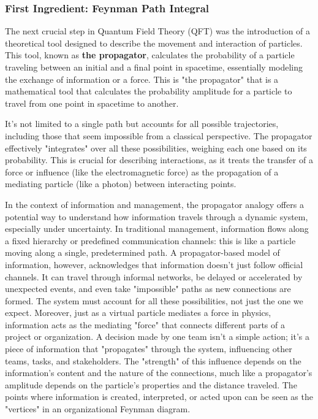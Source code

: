 \documentclass{article}
\begin{document}
\subsubsection*{First Ingredient: Feynman Path Integral}
The next crucial step in Quantum Field Theory (QFT) was the introduction of a theoretical tool designed to describe the movement and interaction of particles. This tool, known as \textbf{the propagator}, calculates the probability of a particle traveling between an initial and a final point in spacetime, essentially modeling the exchange of information or a force. This is "the propagator" that is a mathematical tool that calculates the probability amplitude for a particle to travel from one point in spacetime to another. 

It's not limited to a single path but accounts for all possible trajectories, including those that seem impossible from a classical perspective. The propagator effectively "integrates" over all these possibilities, weighing each one based on its probability. This is crucial for describing interactions, as it treats the transfer of a force or influence (like the electromagnetic force) as the propagation of a mediating particle (like a photon) between interacting points.

In the context of information and management, the propagator analogy offers a potential way to understand how information travels through a dynamic system, especially under uncertainty. In traditional management, information flows along a fixed hierarchy or predefined communication channels: this is like a particle moving along a single, predetermined path. A propagator-based model of information, however, acknowledges that information doesn't just follow official channels. It can travel through informal networks, be delayed or accelerated by unexpected events, and even take "impossible" paths as new connections are formed. The system must account for all these possibilities, not just the one we expect. Moreover, just as a virtual particle mediates a force in physics, information acts as the mediating "force" that connects different parts of a project or organization. A decision made by one team isn't a simple action; it's a piece of information that "propagates" through the system, influencing other teams, tasks, and stakeholders. The "strength" of this influence depends on the information's content and the nature of the connections, much like a propagator's amplitude depends on the particle's properties and the distance traveled. The points where information is created, interpreted, or acted upon can be seen as the "vertices" in an organizational Feynman diagram.
\end{document}

